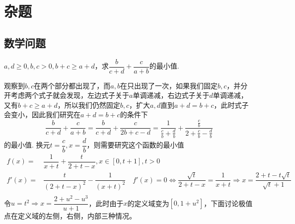 \chapter{杂题}
\section{数学问题}
\newpage
\begin{example}{}{}
    $a,d\geq 0,b,c>0,b+c\geq a+d$，求$\dfrac{b}{c+d}+\dfrac{c}{a+b}$的最小值.
\end{example}
\begin{solution}
    观察到$b,c$在两个部分都出现了，而$a,b$在只出现了一次，如果我们固定$b,c$，并分开考虑两个式子就会发现，左边式子关于$a$单调递减，右边式子关于$d$单调递减，又有$b+c\geq a+d$，所以我们仍然固定$b,c$，扩大$a,d$直到$a+d=b+c$，此时式子会变小，因此我们研究在$a+d=b+c$的条件下
    \[\dfrac{b}{c+d}+\dfrac{c}{a+b}=\dfrac{b}{c+d}+\dfrac{c}{2b+c-d}=\dfrac{1}{\frac{c}{b}+\frac{d}{b}}+\dfrac{\frac{c}{b}}{2+\frac{c}{b}-\frac{d}{b}}\]的最小值.
    换元$t=\dfrac{c}{b},x=\dfrac{d}{b}$，则需要研究这个函数的最小值
    \begin{align*}f(x)=&\dfrac{1}{x+t}+\dfrac{t}{2+t-x},x\in[0,t+1],t>0\\
        f'(x)=&\dfrac{t}{(2+t-x)^2}-\dfrac{1}{(x+t)^2}\quad
        f'(x)=0\Leftrightarrow \dfrac{\sqrt{t}}{2+t-x}=\dfrac{1}{x+t}
        \Rightarrow x=\dfrac{2+t-t\sqrt{t}}{\sqrt{t}+1}\\
    \end{align*}
    令$u=t^2\Rightarrow x=\dfrac{2+u^2-u^3}{u+1}$，此时由于$x$的定义域变为$[0,1+u^2]$，下面讨论极值点在定义域的左侧，右侧，内部三种情况。
\end{solution}